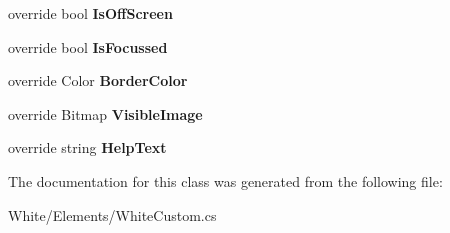 \begin{DoxyCompactItemize}
\item 
\hypertarget{class_proto_test_1_1_golem_1_1_white_1_1_elements_1_1_white_custom_a88c2da3cd64463a33649feae7735d2a1}{override bool {\bfseries Is\-Off\-Screen}}\label{class_proto_test_1_1_golem_1_1_white_1_1_elements_1_1_white_custom_a88c2da3cd64463a33649feae7735d2a1}

\item 
\hypertarget{class_proto_test_1_1_golem_1_1_white_1_1_elements_1_1_white_custom_adaac1a1eeb8fe5a7df10707032d8f7fe}{override bool {\bfseries Is\-Focussed}}\label{class_proto_test_1_1_golem_1_1_white_1_1_elements_1_1_white_custom_adaac1a1eeb8fe5a7df10707032d8f7fe}

\item 
\hypertarget{class_proto_test_1_1_golem_1_1_white_1_1_elements_1_1_white_custom_acc7113b017b9919125758b90320491ba}{override Color {\bfseries Border\-Color}}\label{class_proto_test_1_1_golem_1_1_white_1_1_elements_1_1_white_custom_acc7113b017b9919125758b90320491ba}

\item 
\hypertarget{class_proto_test_1_1_golem_1_1_white_1_1_elements_1_1_white_custom_a3713334eb7f495dc56091f4a44300596}{override Bitmap {\bfseries Visible\-Image}}\label{class_proto_test_1_1_golem_1_1_white_1_1_elements_1_1_white_custom_a3713334eb7f495dc56091f4a44300596}

\item 
\hypertarget{class_proto_test_1_1_golem_1_1_white_1_1_elements_1_1_white_custom_a059b5cbdaa008c0f97cb374477774273}{override string {\bfseries Help\-Text}}\label{class_proto_test_1_1_golem_1_1_white_1_1_elements_1_1_white_custom_a059b5cbdaa008c0f97cb374477774273}

\end{DoxyCompactItemize}


The documentation for this class was generated from the following file\-:\begin{DoxyCompactItemize}
\item 
White/\-Elements/White\-Custom.\-cs\end{DoxyCompactItemize}
